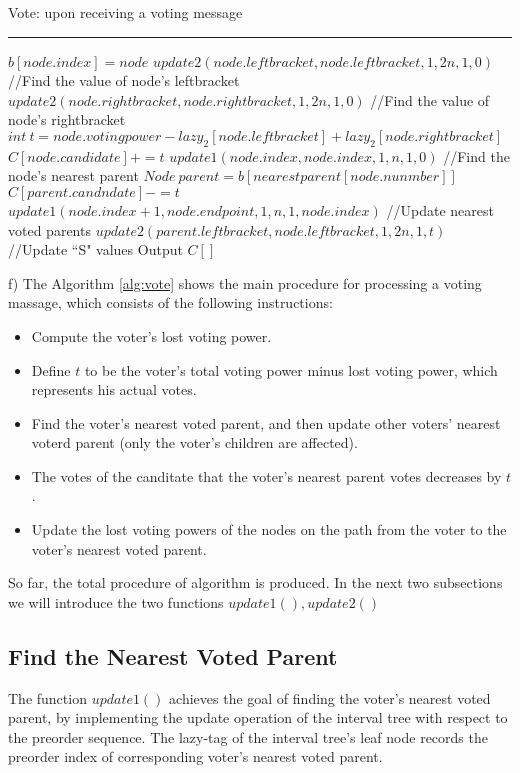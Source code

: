 \begin{algorithm}
	\caption{Vote: upon receiving a voting message}%
	\hrule
	
	$b[node.index]=node$\;
	$update2(node.leftbracket,node.leftbracket,1,2n,1,0)${\color{gray}
		//Find the value of node's leftbracket}\;
	$update2(node.rightbracket,node.rightbracket,1,2n,1,0)${\color{gray}
		//Find the value of node's rightbracket}\;
	$int~t=node.votingpower-lazy_2[node.leftbracket]+lazy_2[node.rightbracket]$\;
	$C[node.candidate]+=t$\;
	$update1(node.index,node.index,1,n,1,0)${\color{gray}
		//Find the node's nearest parent}\;
	$Node~parent = b[nearestparent[node.nunmber]]$\;
	$C[parent.candndate]-=t$\;
	$update1(node.index+1,node.endpoint,1,n,1,node.index)${\color{gray}
		//Update nearest voted parents}\;
	$update2(parent.leftbracket,node.leftbracket,1,2n,1,t)${\color{gray}
		\\//Update ``S" values}\;
	Output $C[]$
	\label{alg:vote}
\end{algorithm}

f) The Algorithm \ref{alg:vote} shows the main procedure for processing a voting massage, which consists of the following instructions: 
\begin{itemize}
	\item Compute the voter's lost voting power.
	\item Define $t$ to be the voter's total voting power minus lost voting power, which represents his actual votes. 
	\item Find the voter's nearest voted parent, and then update other voters' nearest voterd parent (only the voter's children are affected).
	\item The votes of the canditate that the voter's nearest parent votes decreases by $t$.
	\item Update the lost voting powers of the nodes on the path from the voter to the voter's nearest voted parent.
\end{itemize}
So far, the total procedure of algorithm is produced. In the next two subsections we will introduce the two functions $update1(),update2()$ 
\subsection{Find the Nearest Voted Parent}
The function $update1()$ achieves the goal of finding the voter's nearest voted parent, by implementing the update operation of the interval tree with respect to the preorder sequence. The lazy-tag of the interval tree's leaf node records the preorder index of corresponding voter's nearest voted parent. 

